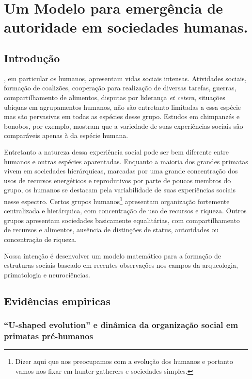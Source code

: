 \chapter{Um Modelo para emergência de autoridade em sociedades humanas.}
\label{ch:autoridade}
\section{Introdução}

, em particular os humanos, apresentam vidas sociais intensas. Atividades sociais, formação de coalizões, cooperação para realização de diversas tarefas, guerras, compartilhamento de alimentos, disputas por liderança \textit{et cetera}, situações ubíquas em agrupamentos humanos, não são entretanto limitadas a essa espécie mas são pervasivas em todas as espécies desse grupo\sourcesneeded. Estudos em chimpanzés e bonobos\cite{deWaal2007}\sourcesneeded, por exemplo, mostram que a variedade de suas experiências sociais são comparáveis apenas à da espécie humana.

Entretanto a natureza dessa experiência social pode ser bem diferente entre humanos e outras espécies aparentadas. Enquanto a maioria dos grandes primatas vivem em sociedades hierárquicas, marcadas por uma grande concentração dos usos de recursos energéticos e reprodutivos por parte de poucos membros do grupo, os humanos se destacam pela variabilidade de suas experiências sociais nesse espectro. Certos grupos humanos\footnote{Dizer aqui que nos preocupamos com a evolução dos humanos e portanto vamos nos fixar em hunter-gatherers e sociedades simples.\clarificationneeded} apresentam organização fortemente centralizada e hierárquica, com concentração de uso de recursos e riqueza. Outros grupos apresentam sociedades basicamente equalitárias, com compartilhamento de recursos e alimentos, ausência de distinções de status, autoridades ou concentração de riqueza. \sourcesneeded

Nossa intenção é desenvolver um modelo matemático para a formação de estruturas sociais baseado em recentes observações nos campos da arqueologia, primatologia e neurociências.

\section{Evidências empiricas}
\subsection{``U-shaped evolution'' e dinâmica da organização social em primatas pré-humanos} 

